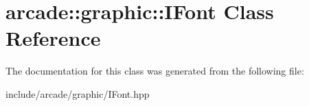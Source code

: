 \hypertarget{classarcade_1_1graphic_1_1_i_font}{}\section{arcade\+::graphic\+::I\+Font Class Reference}
\label{classarcade_1_1graphic_1_1_i_font}


The documentation for this class was generated from the following file\+:\begin{DoxyCompactItemize}
\item 
include/arcade/graphic/I\+Font.\+hpp\end{DoxyCompactItemize}
